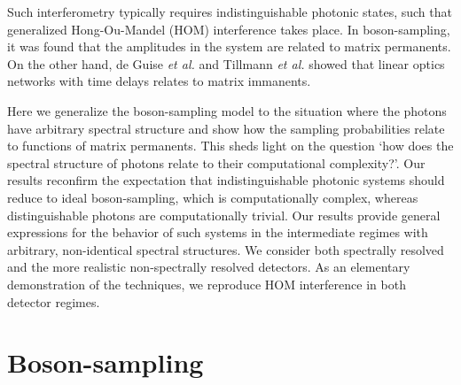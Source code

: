 \documentclass[aps,pra,twocolumn,amsmath,amssymb,nofootinbib,superscriptaddress]{revtex4}
\begin{document}
Such interferometry typically requires indistinguishable photonic states, such that generalized Hong-Ou-Mandel (HOM) \cite{bib:HOM87, bib:RohdeRalph05} interference takes place. In boson-sampling, it was found that the amplitudes in the system are related to matrix permanents. On the other hand, de Guise \emph{et al.} \cite{bib:SandersImm} and Tillmann \emph{et al.} \cite{bib:TillmannImm14} showed that linear optics networks with time delays relates to matrix immanents.

Here we generalize the boson-sampling model to the situation where the photons have arbitrary spectral structure and show how the sampling probabilities relate to functions of matrix permanents. This sheds light on the question `how does the spectral structure of photons relate to their computational complexity?'. Our results reconfirm the expectation that indistinguishable photonic systems should reduce to ideal boson-sampling, which is computationally complex, whereas distinguishable photons are computationally trivial. Our results provide general expressions for the behavior of such systems in the intermediate regimes with arbitrary, non-identical spectral structures. We consider both spectrally resolved and the more realistic non-spectrally resolved detectors. As an elementary demonstration of the techniques, we reproduce HOM interference in both detector regimes.

%
%

\section{Boson-sampling}
\end{document}
